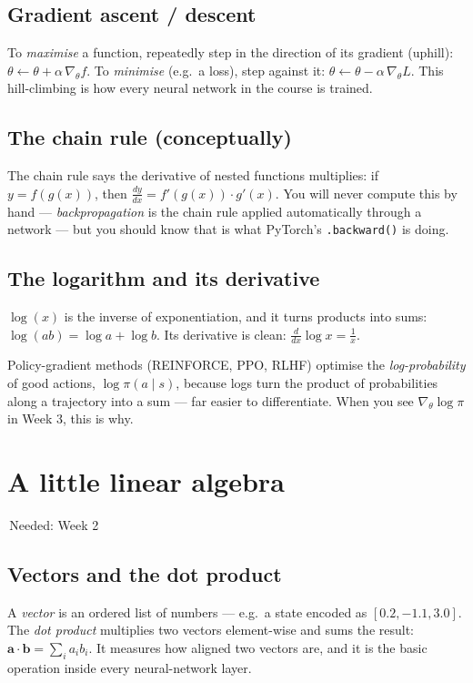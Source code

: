 \documentclass[11pt]{article}
\newcommand{\wk}[1]{{\sffamily\footnotesize\colorbox{slate!12}{\textcolor{slate}{\,Needed: #1\,}}}}
\begin{document}
\subsection{Gradient ascent / descent}
\begin{intuition}
To \emph{maximise} a function, repeatedly step in the direction of its gradient (uphill): $\theta \leftarrow \theta + \alpha\,\nabla_\theta f$. To \emph{minimise} (e.g.\ a loss), step against it: $\theta \leftarrow \theta - \alpha\,\nabla_\theta L$. This hill-climbing is how every neural network in the course is trained.
\end{intuition}

\subsection{The chain rule (conceptually)}
\begin{intuition}
The chain rule says the derivative of nested functions multiplies: if $y = f(g(x))$, then $\tfrac{dy}{dx} = f'(g(x)) \cdot g'(x)$. You will never compute this by hand — \emph{backpropagation} is the chain rule applied automatically through a network — but you should know that is what PyTorch's \texttt{.backward()} is doing.
\end{intuition}

\subsection{The logarithm and its derivative}
\begin{intuition}
$\log(x)$ is the inverse of exponentiation, and it turns products into sums: $\log(ab) = \log a + \log b$. Its derivative is clean: $\tfrac{d}{dx}\log x = \tfrac1x$.
\end{intuition}
\begin{why}
Policy-gradient methods (REINFORCE, PPO, RLHF) optimise the \emph{log-probability} of good actions, $\log \pi(a\mid s)$, because logs turn the product of probabilities along a trajectory into a sum — far easier to differentiate. When you see $\nabla_\theta \log \pi$ in Week 3, this is why.
\end{why}

\section{A little linear algebra}
\wk{Week 2}

\subsection{Vectors and the dot product}
\begin{intuition}
A \emph{vector} is an ordered list of numbers — e.g.\ a state encoded as $[0.2, -1.1, 3.0]$. The \emph{dot product} multiplies two vectors element-wise and sums the result: $\mathbf{a}\cdot\mathbf{b} = \sum_i a_i b_i$. It measures how aligned two vectors are, and it is the basic operation inside every neural-network layer.
\end{intuition}
\end{document}
